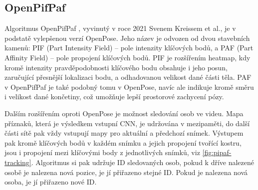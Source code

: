 \subsection{OpenPifPaf}

Algoritmus OpenPifPaf \cite{openpifpaf}, vyvinutý v roce 2021 Svenem Kreissem
et al., je v podstatě vylepšenou verzí OpenPose. Jeho název je odvozen od dvou
stavebních kamenů: PIF (Part Intensity Field) – pole intenzity klíčových bodů,
a PAF (Part Affinity Field) – pole propojení klíčových bodů. PIF je rozšířením
heatmap, kdy kromě intenzity pravděpodobnosti klíčového bodu obsahuje i jeho
posun, zaručující přesnější lokalizaci bodu, a odhadovanou velikost dané části
těla. PAF v OpenPifPaf je také podobný tomu v OpenPose, navíc ale indikuje
kromě směru i velikost dané končetiny, což umožňuje lepší prostorové zachycení
pózy.

Dalším rozšířením oproti OpenPose je možnost sledování osob ve videu. Mapa
příznaků, která je výsledkem vstupní CNN, je udržována v mezipaměti, do další
části sítě pak vždy vstupují mapy pro aktuální a předchozí snímek. Výstupem pak
kromě klíčových bodů v každém snímku a jejich propojení tvořící kostru, jsou i
propojení mezi klíčovými body z jednotlivých snímků, viz
\ref{fig:pipaf-tracking}. Algoritmus si pak udržuje ID sledovaných osob, pokud
k dříve nalezené osobě je nalezena nová pozice, je jí přiřazeno stejné ID.
Pokud je nalezena nová osoba, je jí přiřazeno nové ID.

